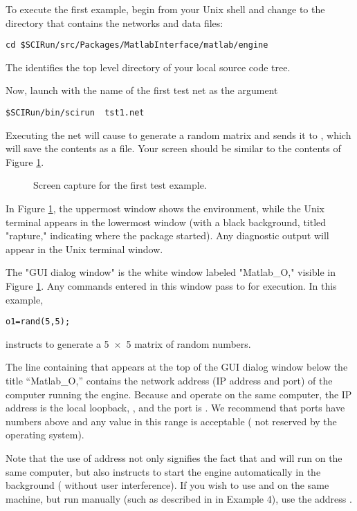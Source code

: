 To execute the first example, begin from your Unix shell and change to the
directory that contains the networks and data files:
%
\begin{verbatim}
cd $SCIRun/src/Packages/MatlabInterface/matlab/engine
\end{verbatim}
%
The  identifies the top level directory of your 
local
\sr{} source code tree.

Now, launch \sr{} with the name of the first test net as the 
argument 
%
\begin{verbatim}
$SCIRun/bin/scirun  tst1.net
\end{verbatim}

Executing the net will cause \m{} to generate a random matrix and sends it
to \sr{}, which will save the contents as a \sr{} file.  Your screen should
be similar to the contents of Figure \ref{fig:tst1}.


\begin{figure}[htb]
  \begin{makeimage}
  \end{makeimage}
  \tstone
  \caption{\label{fig:tst1} Screen capture for the first test
  example.}
\end{figure}


In Figure \ref{fig:tst1}, the uppermost window shows the \sr{} environment,
while the Unix terminal appears in the lowermost window (with a black
background, titled "rapture," indicating where the package started).  Any
diagnostic output will appear in the Unix terminal window.

The "GUI dialog window" is the white window labeled "Matlab\_O," visible in
Figure \ref{fig:tst1}. Any commands entered in this window pass to \m{} for
execution. In this example,
%
\begin{verbatim}
o1=rand(5,5);
\end{verbatim}
%
instructs \m{} to generate a 5~$\times$~5 matrix of random numbers.

The line containing  that appears at the top of the
\mlm{} GUI dialog window below the title ``Matlab\_O,'' contains the
network address (IP address and port) of the computer running the \m{}
engine.  Because \m{} and \sr{} operate on the same computer, the IP
address is the local loopback, , and the port is
. We recommend that ports have numbers above  and any
value in this range is acceptable (\ie{} not reserved by the operating
system).

Note that the use of address  not only signifies the fact
that \sr{} and \m{} will run on the same computer, but also instructs
\mlm{} to start the \m engine automatically in the background (\ie{}
without user interference).  If you wish to use \sr and \m{} on the same
machine, but run \m{} manually (such as described in in Example 4), use the
address .


